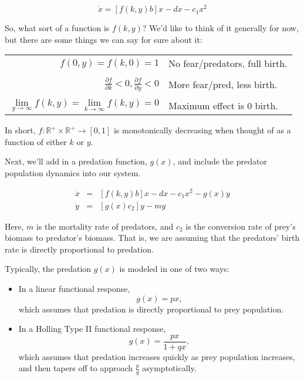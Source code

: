 \documentclass{beamer}
\newcommand{\R}{\mathbb{R}}
\newcommand{\del}{\partial}
\newenvironment{highlight}{\begin{mdframed}[backgroundcolor=gray!20]}{\end{mdframed}}
\begin{document}
\begin{frame}
$$\dot{x}=[f(k,y)b]x-dx-c_1x^2$$

\mbox{}

So, what sort of a function is $f(k,y)$? We'd like to think of it generally for now, but there are some things we can say for sure about it:

\mbox{}

\begin{highlight}
\begin{tabular}{rl}
$f(0,y)=f(k,0)=1$ & No fear/predators, full birth.\\
\\
$\frac{\del f}{\del k}<0, \frac{\del f}{\del y}<0$& More fear/pred, less birth.\\
\\
$\lim\limits_{y\to\infty}f(k,y)=\lim\limits_{k\to\infty}f(k,y)=0$& Maximum effect is 0 birth.\\
\end{tabular}
\end{highlight}

\mbox{}

In short, $f:\R^+\times\R^+\to[0,1]$ is monotonically decreasing when thought of as a function of either $k$ or $y$. 
\end{frame}
\begin{frame}
Next, we'll add in a predation function, $g(x)$, and include the predator population dynamics into our system. 

\[\begin{array}{rcl}
\dot{x}&=&[f(k,y)b]x-dx-c_1x^2-g(x)y\\
\dot{y}&=&[g(x)c_2]y-my
\end{array}\]

Here, $m$ is the mortality rate of predators, and $c_2$ is the conversion rate of prey's biomass to predator's biomass. That is, we are assuming that the predators' birth rate is directly proportional to predation. 

\end{frame}
\begin{frame}%
Typically, the predation $g(x)$ is modeled in one of two ways:

\begin{itemize}
\item In a linear functional response, $$g(x)=px,$$ which assumes that predation is directly proportional to prey population.
\item In a Holling Type II functional response, $$g(x)=\frac{px}{1+qx},$$ which assumes that predation increases quickly as prey population increases, and then tapers off to approach $\frac{p}{q}$ asymptotically. 
\end{itemize}
\end{frame}
\end{document}
